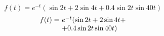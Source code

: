 \documentclass{book}
\begin{document}
\setcounter{chapter}{2}

\begin{equation}
f(t)=e^{-t}(\sin 2t+2\sin 4t+0.4\sin 2t\sin 40t)
\end{equation}
\begin{equation}
\begin{array}{r@{~}l}
f(t)=& e^{-t}(\sin 2t+2\sin 4t+\\
     & +0.4\sin 2t\sin 40t)
\end{array}
\end{equation}
\end{document}
